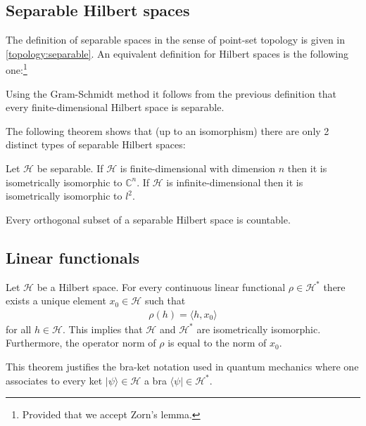 
\subsection{Separable Hilbert spaces}

    The definition of separable spaces in the sense of point-set topology is given in \ref{topology:separable}. An equivalent definition for Hilbert spaces is the following one:\footnote{Provided that we accept Zorn's lemma.}
    \begin{result}
        Using the Gram-Schmidt method it follows from the previous definition that every finite-dimensional Hilbert space is separable.
    \end{result}

    The following theorem shows that (up to an isomorphism) there are only 2 distinct types of separable Hilbert spaces:
    \begin{theorem}
        Let $\mathcal{H}$ be separable. If $\mathcal{H}$ is finite-dimensional with dimension $n$ then it is isometrically isomorphic to $\mathbb{C}^n$. If $\mathcal{H}$ is infinite-dimensional then it is isometrically isomorphic to $l^2$.
    \end{theorem}
    \begin{property}
        Every orthogonal subset of a separable Hilbert space is countable.
    \end{property}

\subsection{Linear functionals}

    \begin{theorem}\label{hilbert:riesz}
        Let $\mathcal{H}$ be a Hilbert space. For every continuous linear functional $\rho\in\mathcal{H}^*$ there exists a unique element $x_0\in\mathcal{H}$ such that
        \begin{gather}
            \rho(h) = \langle h, x_0 \rangle
        \end{gather}
        for all $h\in\mathcal{H}$. This implies that $\mathcal{H}$ and $\mathcal{H}^*$ are isometrically isomorphic. Furthermore, the operator norm of $\rho$ is equal to the norm of $x_0$.
    \end{theorem}
    \begin{remark}
        This theorem justifies the bra-ket notation used in quantum mechanics where one associates to every ket $|\psi\rangle\in\mathcal{H}$ a bra $\langle\psi|\in\mathcal{H}^*$.
    \end{remark}


